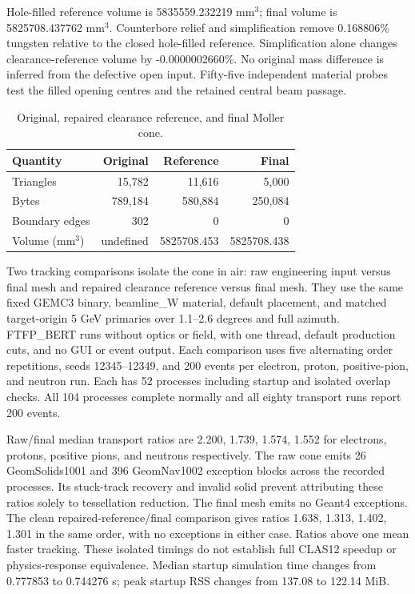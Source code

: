 Hole-filled reference volume is 5835559.232219 mm$^3$; final volume is 5825708.437762 mm$^3$. Counterbore
relief and simplification remove 0.168806\% tungsten relative to the closed hole-filled reference.
Simplification alone changes clearance-reference volume by -0.0000002660\%. No original mass difference is
inferred from the defective open input. Fifty-five independent material probes test the filled opening
centres and the retained central beam passage.

\begin{table}[htbp]
\centering
\caption{Original, repaired clearance reference, and final Moller cone.}
\label{tab:moller-mesh}
\begin{tabular}{lrrr}
\toprule
Quantity & Original & Reference & Final \\
\midrule
Triangles & 15,782 & 11,616 & 5,000 \\
Bytes & 789,184 & 580,884 & 250,084 \\
Boundary edges & 302 & 0 & 0 \\
Volume (mm$^3$) & undefined & 5825708.453 & 5825708.438 \\
\bottomrule
\end{tabular}
\end{table}

Two tracking comparisons isolate the cone in air: raw engineering input versus final mesh and repaired
clearance reference versus final mesh. They use the same fixed GEMC3 binary, beamline\_W material, default
placement, and matched target-origin 5 GeV primaries over 1.1--2.6 degrees and full azimuth. FTFP\_BERT runs
without optics or field, with one thread, default production cuts, and no GUI or event output. Each
comparison uses five alternating order repetitions, seeds 12345--12349, and 200 events per electron, proton,
positive-pion, and neutron run. Each has 52 processes including startup and isolated overlap checks. All 104
processes complete normally and all eighty transport runs report 200 events.

Raw/final median transport ratios are 2.200, 1.739, 1.574, 1.552 for electrons, protons, positive pions, and
neutrons respectively. The raw cone emits 26 GeomSolids1001 and 396 GeomNav1002 exception blocks across the
recorded processes. Its stuck-track recovery and invalid solid prevent attributing these ratios solely to
tessellation reduction. The final mesh emits no Geant4 exceptions. The clean repaired-reference/final
comparison gives ratios 1.638, 1.313, 1.402, 1.301 in the same order, with no exceptions in either case.
Ratios above one mean faster tracking. These isolated timings do not establish full CLAS12 speedup or
physics-response equivalence. Median startup simulation time changes from 0.777853 to 0.744276 s; peak
startup RSS changes from 137.08 to 122.14 MiB.


